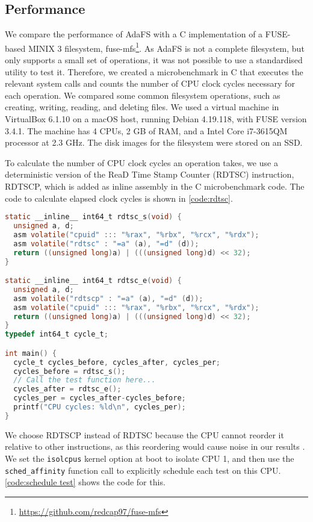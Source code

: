 \subsection{Performance}
We compare the performance of AdaFS with a C implementation of a FUSE-based MINIX 3 filesystem, fuse-mfs\footnote{\url{https://github.com/redcap97/fuse-mfs}}.
As AdaFS is not a complete filesystem, but only supports a small set of operations, it was not possible to use a standardised utility to test it.
Therefore, we created a microbenchmark in C that executes the relevant system calls and counts the number of CPU clock cycles necessary for each operation.
We compared some common filesystem operations, such as creating, writing, reading, and deleting files.
We used a virtual machine in VirtualBox 6.1.10 on a macOS host, running Debian 4.19.118, with FUSE version 3.4.1.
The machine has 4 CPUs, 2 GB of RAM, and a Intel Core i7-3615QM processor at 2.3 GHz.
The disk images for the filesystem were stored on an SSD.

To calculate the number of CPU clock cycles an operation takes, we use a deterministic version of the ReaD Time Stamp Counter (RDTSC) instruction, RDTSCP, which is added as inline assembly in the C microbenchmark code.
The code to calculate elapsed clock cycles is shown in \autoref{code:rdtsc}.

\begin{lstlisting}[caption={Calculating clock cycles}, label={code:rdtsc}, language=C]
static __inline__ int64_t rdtsc_s(void) {
  unsigned a, d;
  asm volatile("cpuid" ::: "%rax", "%rbx", "%rcx", "%rdx");
  asm volatile("rdtsc" : "=a" (a), "=d" (d));
  return ((unsigned long)a) | (((unsigned long)d) << 32);
}

static __inline__ int64_t rdtsc_e(void) {
  unsigned a, d;
  asm volatile("rdtscp" : "=a" (a), "=d" (d));
  asm volatile("cpuid" ::: "%rax", "%rbx", "%rcx", "%rdx");
  return ((unsigned long)a) | (((unsigned long)d) << 32);
}
typedef int64_t cycle_t;

int main() {
  cycle_t cycles_before, cycles_after, cycles_per;
  cycles_before = rdtsc_s();
  // Call the test function here...
  cycles_after = rdtsc_e();
  cycles_per = cycles_after-cycles_before;
  printf("CPU cycles: %ld\n", cycles_per);
}
\end{lstlisting}

We choose RDTSCP instead of RDTSC because the CPU cannot reorder it relative to other instructions, as this reordering would cause noise in our results \cite{delorie2016}.
We set the \lstinline{isolcpus} kernel option at boot to isolate CPU 1, and then use the \lstinline{sched_affinity} function call to explicitly schedule each test on this CPU.
\autoref{code:schedule test} shows the code for this.

